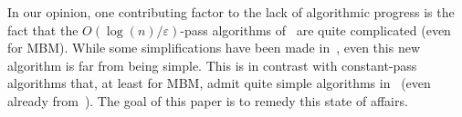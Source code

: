\documentclass{theoretics}
\newcommand{\eps}{\varepsilon}
\begin{document}
In our opinion, one contributing factor to the lack of algorithmic progress is the fact that the $O(\log{\!(n)}/\eps)$-pass algorithms of~\cite{AhnG11b,AhnG15} are quite complicated (even for MBM). While some simplifications have been 
made in~\cite{AssadiJJST22}, even this new algorithm is far from being simple. This is in contrast with constant-pass algorithms that, at least for MBM, 
admit quite simple algorithms in~\cite{AssadiLT21} (even already from~\cite{AhnG11}). The goal of this paper is to remedy this state of affairs. 

\begin{table}[h!]

{\smaller
\begin{tabular}{|c | c | c | c | c | c | c |}


\end{tabular}}
\end{table}
\end{document}

